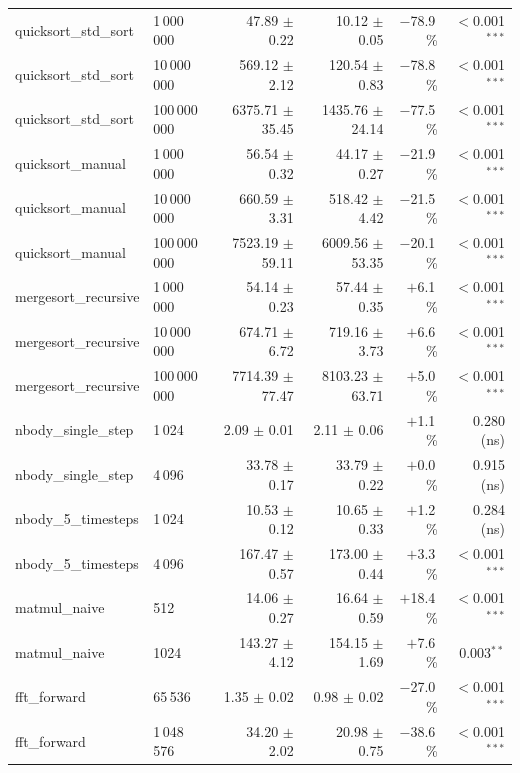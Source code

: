 \documentclass{article}
\begin{document}
\begin{table}[htbp]
\begin{tabular}{llrrrr}
quicksort\_std\_sort     & 1\,000\,000   & 47.89 $\pm$ 0.22  & 10.12 $\pm$ 0.05  & $-$78.9\,\%  & $<$0.001$^{***}$ \\
quicksort\_std\_sort     & 10\,000\,000  & 569.12 $\pm$ 2.12 & 120.54 $\pm$ 0.83 & $-$78.8\,\%  & $<$0.001$^{***}$ \\
quicksort\_std\_sort     & 100\,000\,000 & 6375.71 $\pm$ 35.45 & 1435.76 $\pm$ 24.14 & $-$77.5\,\% & $<$0.001$^{***}$ \\
quicksort\_manual        & 1\,000\,000   & 56.54 $\pm$ 0.32  & 44.17 $\pm$ 0.27  & $-$21.9\,\%  & $<$0.001$^{***}$ \\
quicksort\_manual        & 10\,000\,000  & 660.59 $\pm$ 3.31 & 518.42 $\pm$ 4.42 & $-$21.5\,\%  & $<$0.001$^{***}$ \\
quicksort\_manual        & 100\,000\,000 & 7523.19 $\pm$ 59.11 & 6009.56 $\pm$ 53.35 & $-$20.1\,\% & $<$0.001$^{***}$ \\
mergesort\_recursive     & 1\,000\,000   & 54.14 $\pm$ 0.23  & 57.44 $\pm$ 0.35  & $+$6.1\,\%   & $<$0.001$^{***}$ \\
mergesort\_recursive     & 10\,000\,000  & 674.71 $\pm$ 6.72 & 719.16 $\pm$ 3.73 & $+$6.6\,\%   & $<$0.001$^{***}$ \\
mergesort\_recursive     & 100\,000\,000 & 7714.39 $\pm$ 77.47 & 8103.23 $\pm$ 63.71 & $+$5.0\,\% & $<$0.001$^{***}$ \\
nbody\_single\_step      & 1\,024        & 2.09 $\pm$ 0.01   & 2.11 $\pm$ 0.06   & $+$1.1\,\%   & 0.280 (ns) \\
nbody\_single\_step      & 4\,096        & 33.78 $\pm$ 0.17  & 33.79 $\pm$ 0.22  & $+$0.0\,\%   & 0.915 (ns) \\
nbody\_5\_timesteps      & 1\,024        & 10.53 $\pm$ 0.12  & 10.65 $\pm$ 0.33  & $+$1.2\,\%   & 0.284 (ns) \\
nbody\_5\_timesteps      & 4\,096        & 167.47 $\pm$ 0.57 & 173.00 $\pm$ 0.44 & $+$3.3\,\%   & $<$0.001$^{***}$ \\
matmul\_naive            & 512           & 14.06 $\pm$ 0.27  & 16.64 $\pm$ 0.59  & $+$18.4\,\%  & $<$0.001$^{***}$ \\
matmul\_naive            & 1024          & 143.27 $\pm$ 4.12 & 154.15 $\pm$ 1.69 & $+$7.6\,\%   & 0.003$^{**}$ \\
fft\_forward             & 65\,536       & 1.35 $\pm$ 0.02   & 0.98 $\pm$ 0.02   & $-$27.0\,\%  & $<$0.001$^{***}$ \\
fft\_forward             & 1\,048\,576   & 34.20 $\pm$ 2.02  & 20.98 $\pm$ 0.75  & $-$38.6\,\%  & $<$0.001$^{***}$ \\

\end{tabular}
\end{table}
\end{document}
